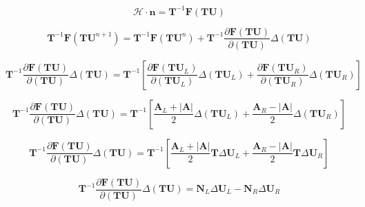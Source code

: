 \documentclass{article}
\begin{document}
\newcommand{\Mi}{\mathbf{M}_i}
\newcommand{\Mj}{\mathbf{M}_j}
\newcommand{\NL}{\mathbf{N}_L}
\newcommand{\NR}{\mathbf{N}_R}
\newcommand{\ML}{\mathbf{M}_L}
\newcommand{\MR}{\mathbf{M}_R}
\newcommand{\AL}{\mathbf{A}_L}
\newcommand{\AR}{\mathbf{A}_R}
\newcommand{\Aroe}{\lvert\mathbf{A}\rvert}
\newcommand{\rotmat}{\mathbf{T}}
\newcommand{\flux}{\mathbf{F}}
\newcommand{\cons}{\mathbf{U}}
\newcommand{\invrotmat}{\mathbf{T}^{-1}}

\begin{equation}
    \mathcal{H} \cdot \mathbf{n}
    =
    \invrotmat\flux(\rotmat\cons)
\end{equation}

\begin{equation}
    \invrotmat\flux(\rotmat\cons^{n+1})
    =
    \invrotmat\flux(\rotmat\cons^{n})
    +
    \invrotmat\frac{\partial\flux(\rotmat\cons)}{\partial(\rotmat\cons)}\Delta(\rotmat\cons)
\end{equation}

\begin{equation}
    \invrotmat\frac{\partial\flux(\rotmat\cons)}{\partial(\rotmat\cons)}\Delta(\rotmat\cons)
    =
    \invrotmat
    \left[
        \frac{\partial\flux(\rotmat\cons_L)}{\partial(\rotmat\cons_L)}\Delta(\rotmat\cons_L)
        +
        \frac{\partial\flux(\rotmat\cons_R)}{\partial(\rotmat\cons_R)}\Delta(\rotmat\cons_R)
    \right]
\end{equation}

\begin{equation}
    \invrotmat\frac{\partial\flux(\rotmat\cons)}{\partial(\rotmat\cons)}\Delta(\rotmat\cons)
    =
    \invrotmat
    \left[
        \frac{\AL + \Aroe}{2}\Delta(\rotmat\cons_L)
        +
        \frac{\AR - \Aroe}{2}\Delta(\rotmat\cons_R)
    \right]
\end{equation}

\begin{equation}
    \invrotmat\frac{\partial\flux(\rotmat\cons)}{\partial(\rotmat\cons)}\Delta(\rotmat\cons)
    =
    \invrotmat
    \left[
        \frac{\AL + \Aroe}{2}\rotmat\Delta\cons_L
        +
        \frac{\AR - \Aroe}{2}\rotmat\Delta\cons_R
    \right]
\end{equation}

\begin{equation}
    \invrotmat\frac{\partial\flux(\rotmat\cons)}{\partial(\rotmat\cons)}\Delta(\rotmat\cons)
    =
    \NL\Delta\cons_L
    -
    \NR\Delta\cons_R
\end{equation}
\end{document}
